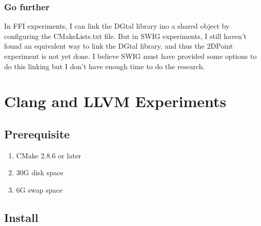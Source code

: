 \subsubsection{Go further}
In FFI experiments, I can link the DGtal library ino a shared object by configuring the CMakeLists.txt file. But in SWIG experiments, I still haven't found an equivalent way to link the DGtal library, and thus the 2DPoint experiment is not yet done. I believe SWIG must have provided some options to do this linking but I don't have enough time to do the research.


\section{Clang and LLVM Experiments}
\subsection{Prerequisite}
    \begin{enumerate}
        \item CMake 2.8.6 or later
        \item 30G disk space
        \item 6G swap space
    \end{enumerate}

\subsection{Install}

